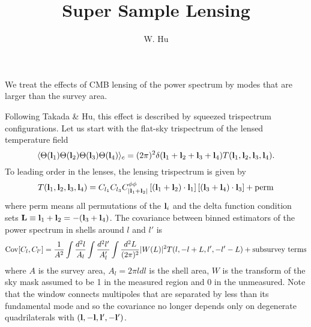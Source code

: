 \documentclass[11pt]{article}
\title{Super Sample Lensing}
\author{W. Hu}
\newcommand{\bl}{{\bf l}}
\newcommand{\bL}{{\bf L}}
\begin{document}
\maketitle

We treat the effects of CMB lensing of the power spectrum by modes that are larger
than the survey area.

Following Takada \& Hu, this effect is described by squeezed trispectrum configurations.
Let us start with the flat-sky trispectrum of the lensed temperature field 
\begin{equation}
\langle \Theta(\bl_1) \Theta(\bl_2) \Theta(\bl_3) \Theta(\bl_4) \rangle_c
= (2\pi)^2 \delta(\bl_1+\bl_2+\bl_3+\bl_4) T(\bl_1,\bl_2,\bl_3,\bl_4) .
\end{equation}
To leading order in the lenses, the lensing trispectrum is given by
\begin{equation}
T(\bl_1,\bl_2,\bl_3,\bl_4) = C_{l_1} C_{l_3} C^{\phi\phi}_{|\bl_1+\bl_2|} 
\left[ (\bl_1+\bl_2)\cdot \bl_1 \right] 
\left[ (\bl_3+\bl_4)\cdot \bl_3 \right] + {\rm perm}
\end{equation}
where perm means all permutations of the $\bl_i$ and the delta function condition 
sets $\bL \equiv \bl_1+\bl_2= -(\bl_3+\bl_4)$.   
The covariance between binned estimators of the power spectrum in shells
around $l$ and $l'$ is
\begin{equation}
{\rm Cov}[{C_{l},C_{l'} }]  = \frac{1}{A^2} \int \frac{d^2 l}{A_l} \int \frac{d^2 l'}{A_l'} 
\int \frac{d^2 L}{(2\pi)^2} | W(L)|^2 T(l,-l+L,l',-l'-L) + {\rm subsurvey\ terms}
\end{equation}
where $A$ is the survey area, $A_l= 2\pi l dl$ is the shell area, $W$ is the transform of
the sky mask assumed to be 1 in the measured region and 0 in the unmeasured.  Note
that the window connects multipoles that are separated by less than its fundamental mode and so the covariance no longer depends only on degenerate quadrilaterals with
$(\bl,-\bl,\bl',-\bl')$.
\end{document}
